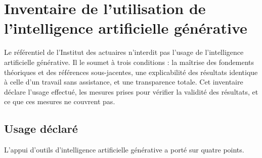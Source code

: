 %

\chapter{Inventaire de l'utilisation de l'intelligence artificielle générative}
\label{ann:ia}


Le référentiel de l'Institut des actuaires n'interdit pas l'usage de l'intelligence artificielle
générative. Il le soumet à trois conditions : la maîtrise des fondements théoriques et des
références sous-jacentes, une explicabilité des résultats identique à celle d'un travail sans
assistance, et une transparence totale. Cet inventaire déclare l'usage effectué, les mesures
prises pour vérifier la validité des résultats, et ce que ces mesures ne couvrent pas.

\section{Usage déclaré}

L'appui d'outils d'intelligence artificielle générative a porté sur quatre points.

